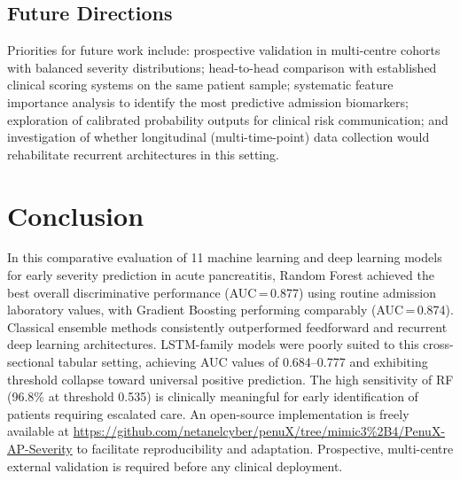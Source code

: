 \documentclass[12pt,a4paper]{article}
\begin{document}
\subsection{Future Directions}

Priorities for future work include: prospective validation in multi-centre cohorts with balanced severity distributions; head-to-head comparison with established clinical scoring systems on the same patient sample; systematic feature importance analysis to identify the most predictive admission biomarkers; exploration of calibrated probability outputs for clinical risk communication; and investigation of whether longitudinal (multi-time-point) data collection would rehabilitate recurrent architectures in this setting.

\section{Conclusion}

In this comparative evaluation of 11 machine learning and deep learning models for early severity prediction in acute pancreatitis, Random Forest achieved the best overall discriminative performance (AUC\,=\,0.877) using routine admission laboratory values, with Gradient Boosting performing comparably (AUC\,=\,0.874). Classical ensemble methods consistently outperformed feedforward and recurrent deep learning architectures. LSTM-family models were poorly suited to this cross-sectional tabular setting, achieving AUC values of 0.684--0.777 and exhibiting threshold collapse toward universal positive prediction. The high sensitivity of RF (96.8\% at threshold 0.535) is clinically meaningful for early identification of patients requiring escalated care. An open-source implementation is freely available at \url{https://github.com/netanelcyber/penuX/tree/mimic3%2B4/PenuX-AP-Severity} to facilitate reproducibility and adaptation. Prospective, multi-centre external validation is required before any clinical deployment.

\vspace{1em}
\noindent{}

\end{document}
